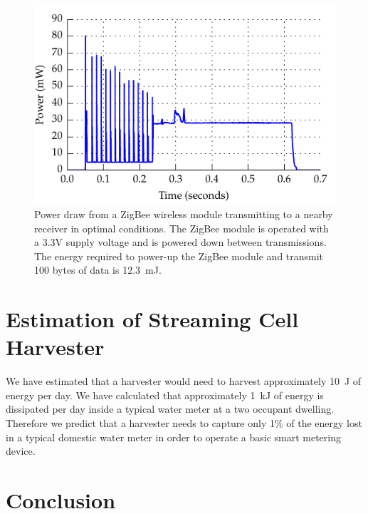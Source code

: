 \documentclass[10pt,final,journal]{IEEEtran}
\begin{document}
    \begin{figure}
        \begin{center}
        \includegraphics[width=\linewidth]{graph_XbeePower_reduced}
        \end{center}
        \caption{Power draw from a ZigBee wireless module transmitting to a nearby receiver in optimal conditions. The ZigBee module is operated with a 3.3V supply voltage and is powered down between transmissions. The energy required to power-up the ZigBee module and transmit 100 bytes of data is \SI{12.3}{\milli\joule}.}
        \label{fig:xbeePower}
    \end{figure}

    \section{Estimation of Streaming Cell Harvester}
    \label{sect:harvesterSize}
    We have estimated that a harvester would need to harvest approximately \SI{10}{\joule} of energy per day.
    We have calculated that approximately \SI{1}{\kilo\joule} of energy is dissipated per day inside a typical water meter at a two occupant dwelling.
    Therefore we predict that a harvester needs to capture only 1\% of the energy lost in a typical domestic water meter in order to operate a basic smart metering device.

    \section{Conclusion}
    
    
\end{document}
